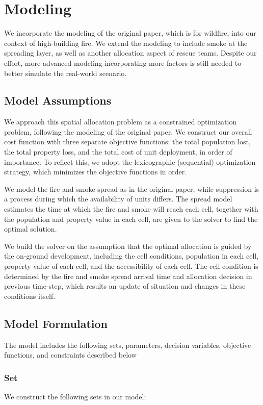 \section{Modeling}
\label{sec:modeling}
We incorporate the modeling of the original paper, which is for wildfire,
into our context of high-building fire. 
We extend the modeling to include smoke at the spreading layer, as well as 
another allocation aspect of rescue teams. 
Despite our effort, more advanced modeling incorporating more factors is still needed
to better simulate the real-world scenario.

\subsection{Model Assumptions}
We approach this spatial allocation problem as a constrained optimization problem, 
following the modeling of the original paper. 
We construct our overall cost function with three separate objective functions: 
the total population lost, the total property loss, and the total cost of unit deployment,
in order of importance. 
To reflect this, we adopt the lexicographic (sequential) optimization strategy, 
which minimizes the objective functions in order. 

We model the fire and smoke spread as in the original paper,
while suppression is a process during which the availability of units differs. 
The spread model estimates the time at which the fire and smoke will reach each cell, 
together with the population and property value in each cell, are given to the solver to 
find the optimal solution. 

We build the solver on the assumption that the optimal allocation is guided by the on-ground
development, including the cell conditions, population in each cell, 
property value of each cell, and the accessibility of each cell. 
The cell condition is determined by the fire and smoke spread arrival time and 
allocation decision in previous time-step, which results an update of situation and
changes in these conditions itself. 

\subsection{Model Formulation}
The model includes the following sets, parameters, decision variables, objective functions,
and constraints described below

\subsubsection{Set}
We construct the following sets in our model: 

